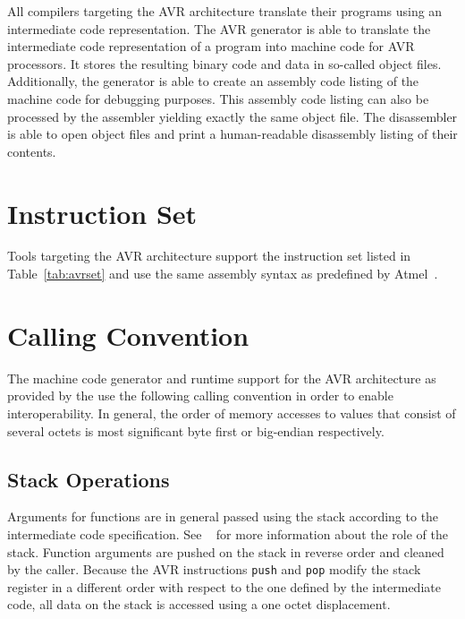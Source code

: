 All compilers targeting the AVR architecture translate their programs using an intermediate code representation.
The AVR generator is able to translate the intermediate code representation of a program into machine code for AVR processors.
It stores the resulting binary code and data in so-called object files.
Additionally, the generator is able to create an assembly code listing of the machine code for debugging purposes.
This assembly code listing can also be processed by the assembler yielding exactly the same object file.
The disassembler is able to open object files and print a human-readable disassembly listing of their contents.
\seeobject\seecode

\section{Instruction Set}

Tools targeting the AVR architecture support the instruction set listed in Table~\ref{tab:avrset} and use the same assembly syntax as predefined by Atmel~\cite{avr:instructionset}.
\seeassembly


\section{Calling Convention}

The machine code generator and runtime support for the AVR architecture as provided by the \ecs{} use the following calling convention in order to enable interoperability.
In general, the order of memory accesses to values that consist of several octets is most significant byte first or big-endian respectively.

\subsection{Stack Operations}

Arguments for functions are in general passed using the stack according to the intermediate code specification.
See \Documentation{}~ for more information about the role of the stack.
Function arguments are pushed on the stack in reverse order and cleaned by the caller.
Because the AVR instructions \texttt{push} and \texttt{pop} modify the stack register in a different order with respect to the one defined by the intermediate code,
all data on the stack is accessed using a one octet displacement.


